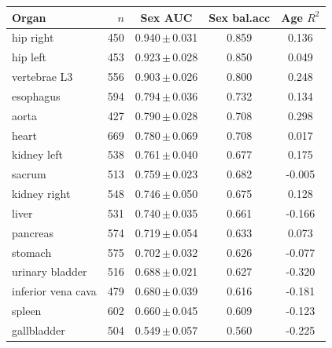 \begin{tabular}{lrccc}
\toprule
Organ & $n$ & Sex AUC & Sex bal.acc & Age $R^2$ \\
\midrule
hip right & 450 & 0.940\,$\pm$\,0.031 & 0.859 & 0.136 \\
hip left & 453 & 0.923\,$\pm$\,0.028 & 0.850 & 0.049 \\
vertebrae L3 & 556 & 0.903\,$\pm$\,0.026 & 0.800 & 0.248 \\
esophagus & 594 & 0.794\,$\pm$\,0.036 & 0.732 & 0.134 \\
aorta & 427 & 0.790\,$\pm$\,0.028 & 0.708 & 0.298 \\
heart & 669 & 0.780\,$\pm$\,0.069 & 0.708 & 0.017 \\
kidney left & 538 & 0.761\,$\pm$\,0.040 & 0.677 & 0.175 \\
sacrum & 513 & 0.759\,$\pm$\,0.023 & 0.682 & -0.005 \\
kidney right & 548 & 0.746\,$\pm$\,0.050 & 0.675 & 0.128 \\
liver & 531 & 0.740\,$\pm$\,0.035 & 0.661 & -0.166 \\
pancreas & 574 & 0.719\,$\pm$\,0.054 & 0.633 & 0.073 \\
stomach & 575 & 0.702\,$\pm$\,0.032 & 0.626 & -0.077 \\
urinary bladder & 516 & 0.688\,$\pm$\,0.021 & 0.627 & -0.320 \\
inferior vena cava & 479 & 0.680\,$\pm$\,0.039 & 0.616 & -0.181 \\
spleen & 602 & 0.660\,$\pm$\,0.045 & 0.609 & -0.123 \\
gallbladder & 504 & 0.549\,$\pm$\,0.057 & 0.560 & -0.225 \\
\bottomrule
\end{tabular}
